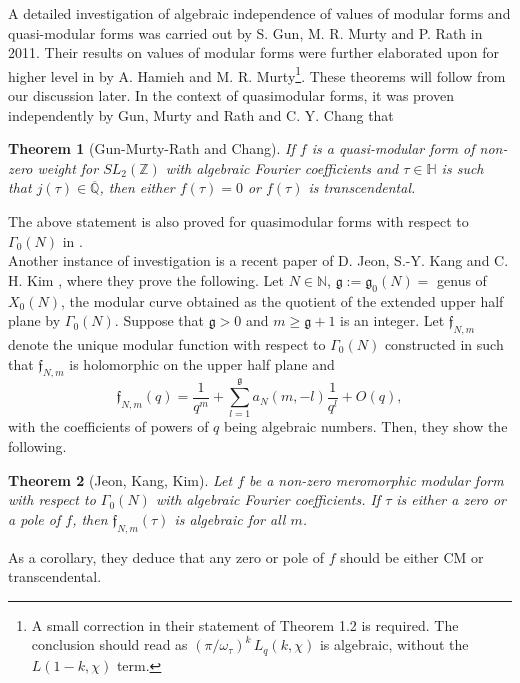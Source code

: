 \documentclass[11pt, reqno]{amsart}
\newtheorem{theorem}{Theorem}[section]
\begin{document}
A detailed investigation of algebraic independence of values of modular forms and quasi-modular forms was carried out by S. Gun, M. R. Murty and P. Rath \cite{r-m-g} in 2011. Their results on values of modular forms were further elaborated upon for higher level in \cite{hamieh-murty} by A. Hamieh and M. R. Murty\footnote{A small correction in their statement of Theorem 1.2 is required. The conclusion should read as ${(\pi/\omega_{\tau})}^k \, L_q(k,\chi)$ is algebraic, without the $L(1-k,\chi)$ term.}. These theorems will follow from our discussion later. In the context of quasimodular forms, it was proven independently by Gun, Murty and Rath \cite[Theorem 7]{r-m-g} and C. Y. Chang \cite{chang} that
\begin{theorem}[Gun-Murty-Rath and Chang]\label{GMR-Chang}
    If $f$ is a quasi-modular form of non-zero weight for $SL_2(\mathbb{Z})$ with algebraic Fourier coefficients and $\tau\in\mathbb{H}$ is such that $j(\tau)\in\overline{\mathbb{Q}}$, then either $f(\tau) = 0$ or $f(\tau)$ is transcendental.  
\end{theorem}
The above statement is also proved for quasimodular forms with respect to $\Gamma_0(N)$ in \cite{r-m-g}.\\


Another instance of investigation is a recent paper of D. Jeon, S.-Y. Kang and C. H. Kim \cite[Theorem 2.4]{jeon-kang-kim}, where they prove the following. Let $N \in \mathbb{N}$, $\mathfrak{g}:=\mathfrak{g}_0(N) = $ genus of $X_0(N)$, the modular curve obtained as the quotient of the extended upper half plane by $\Gamma_0(N)$. Suppose that $\mathfrak{g} > 0$ and $m \geq \mathfrak{g}+1 $ is an integer. Let $\mathfrak{f}_{N,m}$ denote the unique modular function with respect to $\Gamma_0(N)$ constructed in \cite{j-k-k-2} such that $\mathfrak{f}_{N,m}$ is holomorphic on the upper half plane and
\begin{equation*}
    \mathfrak{f}_{N,m}(q) = \frac{1}{q^m} + \sum_{l=1}^\mathfrak{g} a_N(m,-l) \frac{1}{q^l} + O(q),
\end{equation*}
with the coefficients of powers of $q$ being algebraic numbers. Then, they show the following.
\begin{theorem}[Jeon, Kang, Kim]\label{jjk-thm}
   Let $f$ be a non-zero meromorphic modular form with respect to $\Gamma_0(N)$ with algebraic Fourier coefficients. If $\tau$ is either a zero or a pole of $f$, then $\mathfrak{f}_{N,m}(\tau)$ is algebraic for all $m$. 
\end{theorem}
As a corollary, they deduce that any zero or pole of $f$ should be either CM or transcendental.\\
\end{document}

